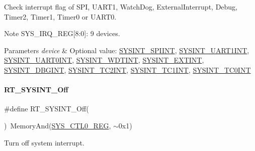 Check interrupt flag of S\+PI, U\+A\+R\+T1, Watch\+Dog, External\+Interrupt, Debug, Timer2, Timer1, Timer0 or U\+A\+R\+T0. 

\begin{DoxyNote}{Note}
S\+Y\+S\+\_\+\+I\+R\+Q\+\_\+\+R\+EG\mbox{[}8\+:0\mbox{]}\+: 9 devices. 
\end{DoxyNote}

\begin{DoxyParams}{Parameters}
{\em device} & Optional value\+: \mbox{\hyperlink{a00011_a2b01c4fb9d69c049d189fea4336e809c}{S\+Y\+S\+I\+N\+T\+\_\+\+S\+P\+I\+I\+NT}}, \mbox{\hyperlink{a00011_a7fe941b86cf5765bd92b867744aef26c}{S\+Y\+S\+I\+N\+T\+\_\+\+U\+A\+R\+T1\+I\+NT}}, \mbox{\hyperlink{a00011_a5443d7bbceafb7ab2592b01489f23499}{S\+Y\+S\+I\+N\+T\+\_\+\+U\+A\+R\+T0\+I\+NT}}, \mbox{\hyperlink{a00011_af64d968502ca7ba62141dd55f5647730}{S\+Y\+S\+I\+N\+T\+\_\+\+W\+D\+T\+I\+NT}}, \mbox{\hyperlink{a00011_a76cdcef76b44ff2f2125afcf05158f00}{S\+Y\+S\+I\+N\+T\+\_\+\+E\+X\+T\+I\+NT}}, \mbox{\hyperlink{a00011_a9abec7bef84c5bc3310714d05e1138dc}{S\+Y\+S\+I\+N\+T\+\_\+\+D\+B\+G\+I\+NT}}, \mbox{\hyperlink{a00011_a6316f8987b7727eeeeb09e4d5d95db96}{S\+Y\+S\+I\+N\+T\+\_\+\+T\+C2\+I\+NT}}, \mbox{\hyperlink{a00011_aa93c611771ffd54f3f00da8b21ed36f2}{S\+Y\+S\+I\+N\+T\+\_\+\+T\+C1\+I\+NT}}, \mbox{\hyperlink{a00011_afda418bf07550de9ce626627e3cc46d0}{S\+Y\+S\+I\+N\+T\+\_\+\+T\+C0\+I\+NT}} \\
\hline
\end{DoxyParams}
\mbox{\label{a00011_a9c68b82296205323f01358d9a27813a9}} 
\paragraph{\texorpdfstring{R\+T\+\_\+\+S\+Y\+S\+I\+N\+T\+\_\+\+Off}{RT\_SYSINT\_Off}}
{\footnotesize\ttfamily \#define R\+T\+\_\+\+S\+Y\+S\+I\+N\+T\+\_\+\+Off(\begin{DoxyParamCaption}{ }\end{DoxyParamCaption})~Memory\+And(\mbox{\hyperlink{a00020_adadaa0ab1ebbd7ba9b70dfd24c3ed44dab61d9968d782d6c00e9de838e38913f5}{S\+Y\+S\+\_\+\+C\+T\+L0\+\_\+\+R\+EG}}, $\sim$0x1)}



Turn off system interrupt. 

